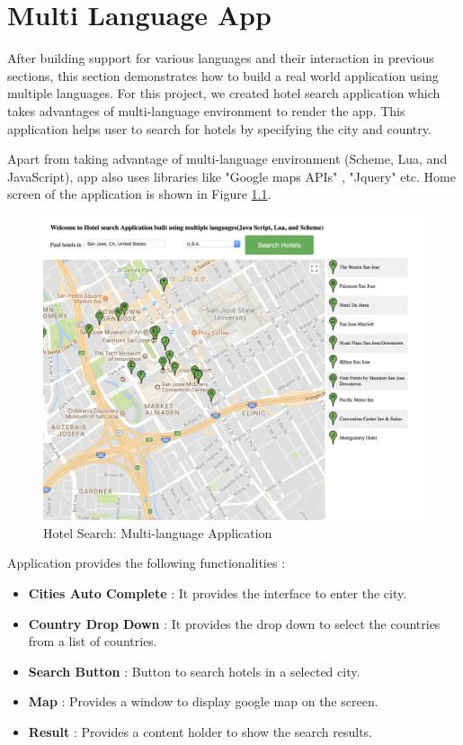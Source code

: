 \chapter{Multi Language App}

After building support for various languages and their interaction in previous sections, this section demonstrates how to build a real world application using multiple languages. For this project, we created hotel search application which takes advantages of multi-language environment to render the app. This application helps user to search for hotels by specifying the city and country. 

Apart from taking advantage of multi-language environment (Scheme, Lua, and JavaScript), app also uses libraries like "Google maps APIs" \cite{googlemapsapi}, "Jquery" \cite{jquery} etc. Home screen of the application is shown in Figure \ref{fig:multilangapp}.

\begin{figure}[H]
	\begin{center}
		\includegraphics[width=\linewidth]{./images/multilangapp.png}
	\end{center}
	\caption{Hotel Search: Multi-language Application}
	\label{fig:multilangapp}
\end{figure}

Application provides the following functionalities : 
\begin{itemize}
	\item {\textbf{Cities Auto Complete} : It provides the interface to enter the city. }
	\item {\textbf{Country Drop Down} : It provides the drop down to select the countries from a list of countries.}
	\item {\textbf{Search Button} : Button to search hotels in a selected city.}
	\item {\textbf{Map} : Provides a window to display google map on the screen.}
	\item {\textbf{Result} : Provides a content holder to show the search results.}
\end{itemize}

